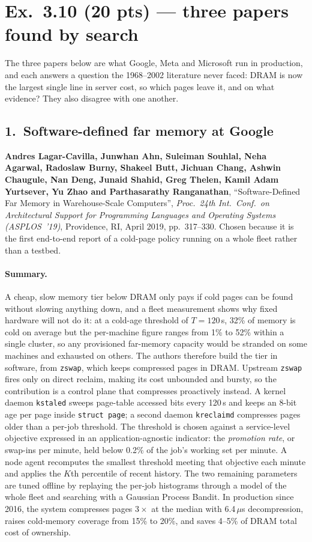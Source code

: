 \section*{Ex.~3.10 \quad (20 pts) --- three papers found by search}

The three papers below are what Google, Meta and Microsoft run in production, and each
answers a question the 1968--2002 literature never faced: DRAM is now the largest single
line in server cost, so which pages leave it, and on what evidence? They also disagree
with one another.

\subsection*{1.~Software-defined far memory at Google}

\noindent\textbf{Andres Lagar-Cavilla, Junwhan Ahn, Suleiman Souhlal, Neha Agarwal,
Radoslaw Burny, Shakeel Butt, Jichuan Chang, Ashwin Chaugule, Nan Deng, Junaid Shahid,
Greg Thelen, Kamil Adam Yurtsever, Yu Zhao and Parthasarathy Ranganathan},
``Software-Defined Far Memory in Warehouse-Scale Computers'', \emph{Proc.\ 24th Int.\
Conf.\ on Architectural Support for Programming Languages and Operating Systems
(ASPLOS~'19)}, Providence, RI, April 2019, pp.~317--330. Chosen because it is the first
end-to-end report of a cold-page policy running on a whole fleet rather than a testbed.

\paragraph{Summary.}
A cheap, slow memory tier below DRAM only pays if cold pages can be found without
slowing anything down, and a fleet measurement shows why fixed hardware will not do it:
at a cold-age threshold of $T=120$\,s, 32\% of memory is cold on average but the
per-machine figure ranges from 1\% to 52\% within a single cluster, so any provisioned
far-memory capacity would be stranded on some machines and exhausted on others. The
authors therefore build the tier in software, from \texttt{zswap}, which keeps
compressed pages in DRAM. Upstream \texttt{zswap} fires only on direct reclaim, making
its cost unbounded and bursty, so the contribution is a control plane that compresses
proactively instead. A kernel daemon \texttt{kstaled} sweeps page-table accessed bits
every 120\,s and keeps an 8-bit age per page inside \texttt{struct page}; a second
daemon \texttt{kreclaimd} compresses pages older than a per-job threshold. The threshold
is chosen against a service-level objective expressed in an application-agnostic
indicator: the \emph{promotion rate}, or swap-ins per minute, held below 0.2\% of the
job's working set per minute. A node agent recomputes the smallest threshold meeting
that objective each minute and applies the $K$th percentile of recent history. The two
remaining parameters are tuned offline by replaying the per-job histograms through a
model of the whole fleet and searching with a Gaussian Process Bandit. In production
since 2016, the system compresses pages $3\times$ at the median with 6.4\,$\mu$s
decompression, raises cold-memory coverage from 15\% to 20\%, and saves 4--5\% of DRAM
total cost of ownership.

